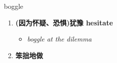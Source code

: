 
\begin{frame}
{\huge boggle}
\begin{center}
\begin{enumerate}\Large
  \item \textbf{(因为怀疑、恐惧)犹豫 hesitate}
  \begin{itemize}
    \item \em{\Large{boggle at the dilemma}}
  \end{itemize}
  \item \textbf{笨拙地做}
\end{enumerate}
\end{center}
\end{frame}
